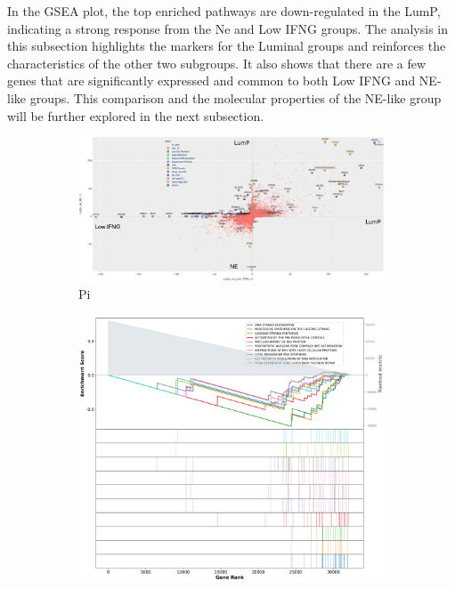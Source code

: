 In the GSEA plot, the top enriched pathways are down-regulated in the LumP, indicating a strong response from the Ne and Low IFNG groups. The analysis in this subsection highlights the markers for the Luminal groups and reinforces the characteristics of the other two subgroups. It also shows that there are a few genes that are significantly expressed and common to both Low IFNG and NE-like groups. This comparison and the molecular properties of the NE-like group will be further explored in the next subsection.


\begin{figure}[H]
    \centering
    \begin{subfigure}[!t]{1.0\textwidth}
        \includegraphics[width=\textwidth,keepaspectratio]{Sections/ClusteringAnalysis/Resources/discussion/other_groups/lump_pi.png}    
        \caption{Pi}
        \label{fig:cs:lumP_pi}
    \end{subfigure}
    \centering
    \begin{subfigure}[!t]{0.69\textwidth}
        \includegraphics[width=\textwidth, keepaspectratio]{Sections/ClusteringAnalysis/Resources/discussion/other_groups/lumP2_reactome_10_top.png}

\end{subfigure}
\end{figure}
